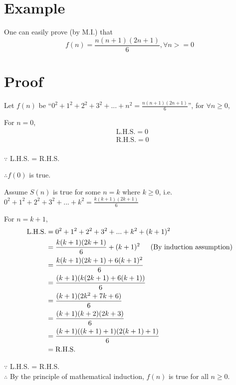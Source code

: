 \documentclass{article}
\begin{document}
\section*{Example}
One can easily prove (by M.I.) that
\begin{equation}
   f(n) = \frac{n(n+1)(2n+1)}{6}, \forall n >= 0
\end{equation}

\section*{Proof}

\begin{flushleft}
Let $f(n)$ be ``$0^2+1^2+2^2+3^2+...+n^2=\frac{n(n+1)(2n+1)}{6}$'',
for $\forall n \geq 0$,
\end{flushleft}

For $n=0$,
\begin{align*}
   & \text{L.H.S.} = 0 \\
   & \text{R.H.S.} = 0 \\
\end{align*}

$\because$ L.H.S. = R.H.S.

$\therefore f(0)$ is true.

\begin{flushleft}

   Assume $S(n)$ is true for some $n=k$ where $k \geq 0$,
   i.e. $0^2+1^2+2^2+3^2+...+k^2=\frac{k(k+1)(2k+1)}{6}$

\end{flushleft}

For $n=k+1$,
\begin{align*}
\text{L.H.S.} &= 0^2+1^2+2^2+3^2+...+k^2+(k+1)^2 \\
&= \frac{k(k+1)(2k+1)}{6}+(k+1)^2
\text{\indent(By induction assumption)} \\
&= \frac{k(k+1)(2k+1)+6(k+1)^2}{6} \\
&= \frac{(k+1)(k(2k+1)+6(k+1))}{6} \\
&= \frac{(k+1)(2k^2+7k+6)}{6} \\
&= \frac{(k+1)(k+2)(2k+3)}{6} \\
&= \frac{(k+1)((k+1)+1)(2(k+1)+1)}{6} \\
&= \text{R.H.S.}
\end{align*}

\begin{flushleft}
   $\because$ L.H.S. = R.H.S. \\
   $\therefore$ By the principle of mathematical induction,
   $f(n)$ is true for all $n \geq 0$.
\end{flushleft}
\end{document}
